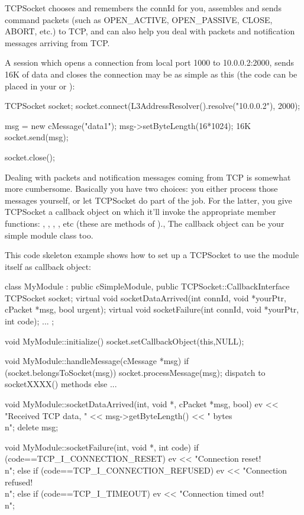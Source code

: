 TCPSocket chooses and remembers the connId for you, assembles and sends command
packets (such as OPEN\_ACTIVE, OPEN\_PASSIVE, CLOSE, ABORT, etc.) to TCP,
and can also help you deal with packets and notification messages arriving
from TCP.

A session which opens a connection from local port 1000 to 10.0.0.2:2000,
sends 16K of data and closes the connection may be as simple as this
(the code can be placed in your  or
):

\begin{cpp}
TCPSocket socket;
socket.connect(L3AddressResolver().resolve("10.0.0.2"), 2000);

msg = new cMessage("data1");
msg->setByteLength(16*1024);  16K
socket.send(msg);

socket.close();
\end{cpp}


Dealing with packets and notification messages coming from TCP is somewhat
more cumbersome. Basically you have two choices: you either process those
messages yourself, or let TCPSocket do part of the job. For the latter,
you give TCPSocket a callback object on which it'll invoke the appropriate
member functions: , ,
, ,
etc (these are methods of ).,
The callback object can be your simple module class too.

This code skeleton example shows how to set up a TCPSocket to use the module
itself as callback object:

\begin{cpp}
class MyModule : public cSimpleModule, public TCPSocket::CallbackInterface
{
    TCPSocket socket;
    virtual void socketDataArrived(int connId, void *yourPtr,
                                   cPacket *msg, bool urgent);
    virtual void socketFailure(int connId, void *yourPtr, int code);
    ...
};

void MyModule::initialize() {
    socket.setCallbackObject(this,NULL);
}

void MyModule::handleMessage(cMessage *msg) {
    if (socket.belongsToSocket(msg))
        socket.processMessage(msg); dispatch to socketXXXX() methods
    else
        ...
}

void MyModule::socketDataArrived(int, void *, cPacket *msg, bool) {
    ev << "Received TCP data, " << msg->getByteLength() << " bytes\\n";
    delete msg;
}

void MyModule::socketFailure(int, void *, int code) {
    if (code==TCP_I_CONNECTION_RESET)
        ev << "Connection reset!\\n";
    else if (code==TCP_I_CONNECTION_REFUSED)
        ev << "Connection refused!\\n";
    else if (code==TCP_I_TIMEOUT)
        ev << "Connection timed out!\\n";
}
\end{cpp}

